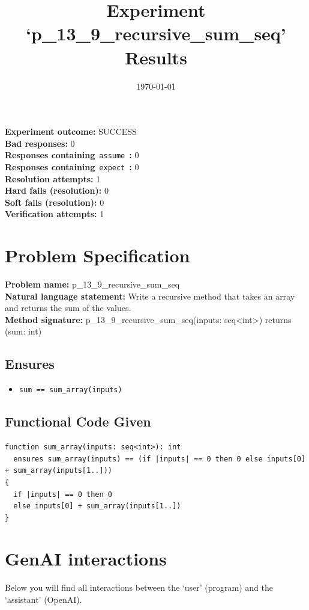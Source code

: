 \documentclass{article}
\begin{document}
\title{Experiment `p\_13\_9\_recursive\_sum\_seq' Results}
\author{\today}
\date{}
\maketitle
\textbf{Experiment outcome: }SUCCESS
\\\textbf{Bad responses: }0
\\\textbf{Responses containing}~\texttt{assume}~\textbf{: }0
\\\textbf{Responses containing}~\texttt{expect}~\textbf{: }0
\\\textbf{Resolution attempts: }1
\\\textbf{Hard fails (resolution): }0
\\\textbf{Soft fails (resolution): }0
\\\textbf{Verification attempts: }1
\section*{Problem Specification}
\textbf{Problem name: }p\_13\_9\_recursive\_sum\_seq
\\\textbf{Natural language statement: }Write a recursive method that takes an array and returns the sum of the values.
\\\textbf{Method signature: }p\_13\_9\_recursive\_sum\_seq(inputs: seq<int>) returns (sum: int)
\subsection*{Ensures}
\begin{itemize}
\item \texttt{sum == sum\_array(inputs)}
\end{itemize}
\subsection*{Functional Code Given}
\begin{lstlisting}
function sum_array(inputs: seq<int>): int
  ensures sum_array(inputs) == (if |inputs| == 0 then 0 else inputs[0] + sum_array(inputs[1..]))
{
  if |inputs| == 0 then 0
  else inputs[0] + sum_array(inputs[1..])
}
\end{lstlisting}
\clearpage
\section*{GenAI interactions}
Below you will find all interactions between the `user' (program) and the `assistant' (OpenAI).
\end{document}
